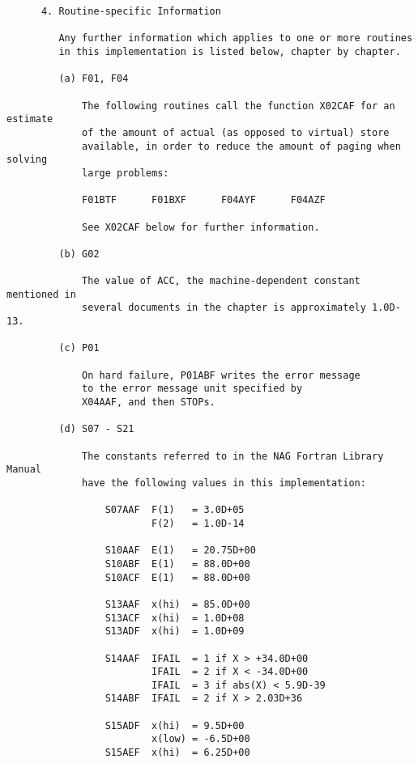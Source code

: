 \begin{small}
\begin{verbatim}
      4. Routine-specific Information

         Any further information which applies to one or more routines
         in this implementation is listed below, chapter by chapter.

         (a) F01, F04

             The following routines call the function X02CAF for an estimate
             of the amount of actual (as opposed to virtual) store
             available, in order to reduce the amount of paging when solving
             large problems:

             F01BTF      F01BXF      F04AYF      F04AZF

             See X02CAF below for further information.

         (b) G02

             The value of ACC, the machine-dependent constant mentioned in
             several documents in the chapter is approximately 1.0D-13.

         (c) P01

             On hard failure, P01ABF writes the error message
             to the error message unit specified by
             X04AAF, and then STOPs.

         (d) S07 - S21

             The constants referred to in the NAG Fortran Library Manual
             have the following values in this implementation:

                 S07AAF  F(1)   = 3.0D+05
                         F(2)   = 1.0D-14

                 S10AAF  E(1)   = 20.75D+00
                 S10ABF  E(1)   = 88.0D+00
                 S10ACF  E(1)   = 88.0D+00

                 S13AAF  x(hi)  = 85.0D+00
                 S13ACF  x(hi)  = 1.0D+08
                 S13ADF  x(hi)  = 1.0D+09

                 S14AAF  IFAIL  = 1 if X > +34.0D+00
                         IFAIL  = 2 if X < -34.0D+00
                         IFAIL  = 3 if abs(X) < 5.9D-39
                 S14ABF  IFAIL  = 2 if X > 2.03D+36

                 S15ADF  x(hi)  = 9.5D+00
                         x(low) = -6.5D+00
                 S15AEF  x(hi)  = 6.25D+00


\end{verbatim}
\end{small}
